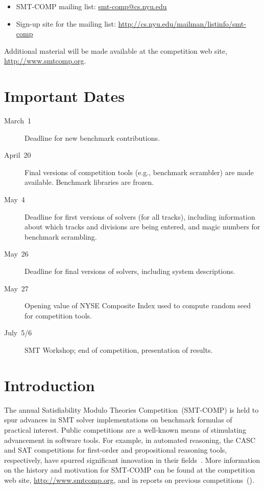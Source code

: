 \documentclass[12pt]{article}
\begin{document}
\begin{itemize}
\item SMT-COMP mailing list:
  \href{mailto:smt-comp@cs.nyu.edu}{\textrm{smt-comp@cs.nyu.edu}}
\item Sign-up site for the mailing list:
  \url{http://cs.nyu.edu/mailman/listinfo/smt-comp}
\end{itemize}

\noindent Additional material will be made available at the
competition web site, \url{http://www.smtcomp.org}.


\newpage

\section{Important Dates}
\label{sec:important}

\begin{description}
\item[March~1] Deadline for new benchmark contributions.
\item[April~20] Final versions of competition tools (e.g., benchmark
  scrambler) are made available.  Benchmark libraries are frozen.
\item[May~4] Deadline for first versions of solvers (for all tracks),
  including information about which tracks and divisions are being
  entered, and magic numbers for benchmark scrambling.
\item[May~26] Deadline for final versions of solvers, including
  system descriptions.
\item[May~27] Opening value of NYSE Composite Index used to compute
  random seed for competition tools.
\item[July~5/6] SMT Workshop; end of competition, presentation of
  results.
\end{description}


\section{Introduction}

The annual Satisfiability Modulo Theories Competition~(SMT-COMP) is
held to spur advances in SMT solver implementations on benchmark
formulas of practical interest.  Public competitions are a well-known
means of stimulating advancement in software tools.  For example, in
automated reasoning, the CASC and SAT competitions for first-order and
propositional reasoning tools, respectively, have spurred significant
innovation in their fields~\cite{leberre+03,PSS02}.  More information
on the history and motivation for SMT-COMP can be found at the
competition web site, \url{http://www.smtcomp.org}, and in reports on
previous
competitions~(\cite{SMTCOMP-JAR,SMTCOMP-FMSD,BDOS08,SMTCOMP-2008,CDW14,SMTCOMP-2012,CSW15}).
\end{document}

